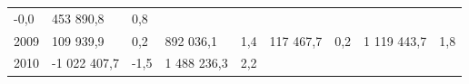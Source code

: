 \begin{longtable}[]{@{}lllllllll@{}}
\begin{minipage}[t]{0.06\columnwidth}
-0,0\strut
\end{minipage} & \begin{minipage}[t]{0.10\columnwidth}\raggedright
453 890,8\strut
\end{minipage} & \begin{minipage}[t]{0.06\columnwidth}\raggedright
0,8\strut
\end{minipage}\tabularnewline
\begin{minipage}[t]{0.05\columnwidth}\raggedright
2009\strut
\end{minipage} & \begin{minipage}[t]{0.10\columnwidth}\raggedright
109 939,9\strut
\end{minipage} & \begin{minipage}[t]{0.06\columnwidth}\raggedright
0,2\strut
\end{minipage} & \begin{minipage}[t]{0.16\columnwidth}\raggedright
892 036,1\strut
\end{minipage} & \begin{minipage}[t]{0.06\columnwidth}\raggedright
1,4\strut
\end{minipage} & \begin{minipage}[t]{0.12\columnwidth}\raggedright
117 467,7\strut
\end{minipage} & \begin{minipage}[t]{0.06\columnwidth}\raggedright
0,2\strut
\end{minipage} & \begin{minipage}[t]{0.10\columnwidth}\raggedright
1 119 443,7\strut
\end{minipage} & \begin{minipage}[t]{0.06\columnwidth}\raggedright
1,8\strut
\end{minipage}\tabularnewline
\begin{minipage}[t]{0.05\columnwidth}\raggedright
2010\strut
\end{minipage} & \begin{minipage}[t]{0.10\columnwidth}\raggedright
-1 022 407,7\strut
\end{minipage} & \begin{minipage}[t]{0.06\columnwidth}\raggedright
-1,5\strut
\end{minipage} & \begin{minipage}[t]{0.16\columnwidth}\raggedright
1 488 236,3\strut
\end{minipage} & \begin{minipage}[t]{0.06\columnwidth}\raggedright
2,2\strut

\end{minipage}
\end{longtable}
